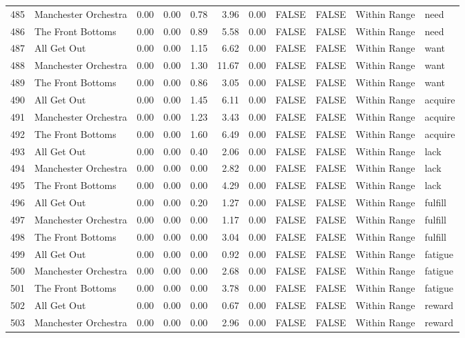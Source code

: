 \begin{table}[ht]
\begin{tabular}{rlrrrrrllll}
  485 & Manchester Orchestra & 0.00 & 0.00 & 0.78 & 3.96 & 0.00 & FALSE & FALSE & Within Range & need \\ 
  486 & The Front Bottoms & 0.00 & 0.00 & 0.89 & 5.58 & 0.00 & FALSE & FALSE & Within Range & need \\ 
  487 & All Get Out & 0.00 & 0.00 & 1.15 & 6.62 & 0.00 & FALSE & FALSE & Within Range & want \\ 
  488 & Manchester Orchestra & 0.00 & 0.00 & 1.30 & 11.67 & 0.00 & FALSE & FALSE & Within Range & want \\ 
  489 & The Front Bottoms & 0.00 & 0.00 & 0.86 & 3.05 & 0.00 & FALSE & FALSE & Within Range & want \\ 
  490 & All Get Out & 0.00 & 0.00 & 1.45 & 6.11 & 0.00 & FALSE & FALSE & Within Range & acquire \\ 
  491 & Manchester Orchestra & 0.00 & 0.00 & 1.23 & 3.43 & 0.00 & FALSE & FALSE & Within Range & acquire \\ 
  492 & The Front Bottoms & 0.00 & 0.00 & 1.60 & 6.49 & 0.00 & FALSE & FALSE & Within Range & acquire \\ 
  493 & All Get Out & 0.00 & 0.00 & 0.40 & 2.06 & 0.00 & FALSE & FALSE & Within Range & lack \\ 
  494 & Manchester Orchestra & 0.00 & 0.00 & 0.00 & 2.82 & 0.00 & FALSE & FALSE & Within Range & lack \\ 
  495 & The Front Bottoms & 0.00 & 0.00 & 0.00 & 4.29 & 0.00 & FALSE & FALSE & Within Range & lack \\ 
  496 & All Get Out & 0.00 & 0.00 & 0.20 & 1.27 & 0.00 & FALSE & FALSE & Within Range & fulfill \\ 
  497 & Manchester Orchestra & 0.00 & 0.00 & 0.00 & 1.17 & 0.00 & FALSE & FALSE & Within Range & fulfill \\ 
  498 & The Front Bottoms & 0.00 & 0.00 & 0.00 & 3.04 & 0.00 & FALSE & FALSE & Within Range & fulfill \\ 
  499 & All Get Out & 0.00 & 0.00 & 0.00 & 0.92 & 0.00 & FALSE & FALSE & Within Range & fatigue \\ 
  500 & Manchester Orchestra & 0.00 & 0.00 & 0.00 & 2.68 & 0.00 & FALSE & FALSE & Within Range & fatigue \\ 
  501 & The Front Bottoms & 0.00 & 0.00 & 0.00 & 3.78 & 0.00 & FALSE & FALSE & Within Range & fatigue \\ 
  502 & All Get Out & 0.00 & 0.00 & 0.00 & 0.67 & 0.00 & FALSE & FALSE & Within Range & reward \\ 
  503 & Manchester Orchestra & 0.00 & 0.00 & 0.00 & 2.96 & 0.00 & FALSE & FALSE & Within Range & reward \\ 

\end{tabular}
\end{table}
